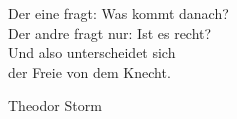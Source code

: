 \thispagestyle{empty}

\vspace*{\fill}

\begin{center}
Der eine fragt: Was kommt danach? \\
Der andre fragt nur: Ist es recht? \\
Und also unterscheidet sich \\
der Freie von dem Knecht.
\end{center}

\begin{flushright}
Theodor Storm
\end{flushright}

\vspace*{\fill}

